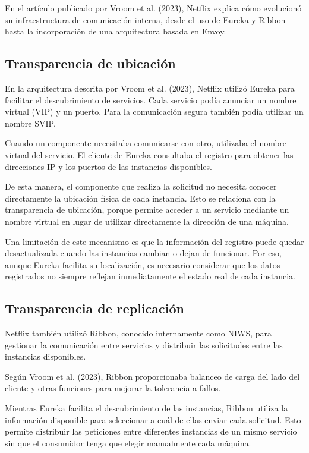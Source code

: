 En el artículo publicado por Vroom et al. (2023), Netflix explica cómo evolucionó su infraestructura de comunicación interna, desde el uso de Eureka y Ribbon hasta la incorporación de una arquitectura basada en Envoy.

\subsection{Transparencia de ubicación}

En la arquitectura descrita por Vroom et al. (2023), Netflix utilizó Eureka para facilitar el descubrimiento de servicios. Cada servicio podía anunciar un nombre virtual (VIP) y un puerto. Para la comunicación segura también podía utilizar un nombre SVIP.

Cuando un componente necesitaba comunicarse con otro, utilizaba el nombre virtual del servicio. El cliente de Eureka consultaba el registro para obtener las direcciones IP y los puertos de las instancias disponibles.

De esta manera, el componente que realiza la solicitud no necesita conocer directamente la ubicación física de cada instancia. Esto se relaciona con la transparencia de ubicación, porque permite acceder a un servicio mediante un nombre virtual en lugar de utilizar directamente la dirección de una máquina.

Una limitación de este mecanismo es que la información del registro puede quedar desactualizada cuando las instancias cambian o dejan de funcionar. Por eso, aunque Eureka facilita su localización, es necesario considerar que los datos registrados no siempre reflejan inmediatamente el estado real de cada instancia.

\subsection{Transparencia de replicación}

Netflix también utilizó Ribbon, conocido internamente como NIWS, para gestionar la comunicación entre servicios y distribuir las solicitudes entre las instancias disponibles.

Según Vroom et al. (2023), Ribbon proporcionaba balanceo de carga del lado del cliente y otras funciones para mejorar la tolerancia a fallos.

Mientras Eureka facilita el descubrimiento de las instancias, Ribbon utiliza la información disponible para seleccionar a cuál de ellas enviar cada solicitud. Esto permite distribuir las peticiones entre diferentes instancias de un mismo servicio sin que el consumidor tenga que elegir manualmente cada máquina.

